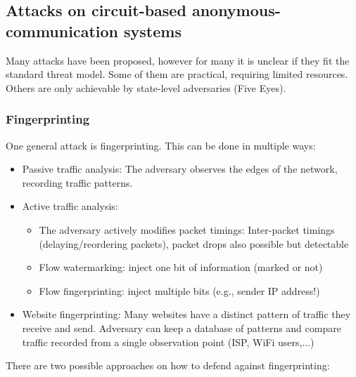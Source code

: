 \documentclass[11pt,oneside,a4paper]{article}
\begin{document}
\subsection{Attacks on circuit-based anonymous-communication systems}

Many attacks have been proposed, however for many it is unclear if they fit the standard threat model. Some of them are practical, requiring limited resources. Others are only achievable by state-level adversaries (Five Eyes).

\subsubsection{Fingerprinting}

One general attack is fingerprinting. This can be done in multiple ways:

\vspace{-\topsep}
\begin{itemize}
	\setlength{\itemsep}{0pt}
	\setlength{\parskip}{0pt}
	\item Passive traffic analysis: The adversary observes the edges of the network, recording traffic patterns.
	\item Active traffic analysis: 
	\begin{itemize}
		\item The adversary actively modifies packet timings: Inter-packet timings (delaying/reordering packets), packet drops also possible but detectable
		\item Flow watermarking: inject one bit of information (marked or not)
		\item Flow fingerprinting: inject multiple bits (e.g., sender IP address!)
	\end{itemize}
	\item Website fingerprinting: Many websites have a distinct pattern of traffic they receive and send. Adversary can keep a database of patterns and compare traffic recorded from a single observation point (ISP, WiFi users,...)
\end{itemize}
\vspace{-\topsep}

\noindent There are two possible approaches on how to defend against fingerprinting:
\end{document}
